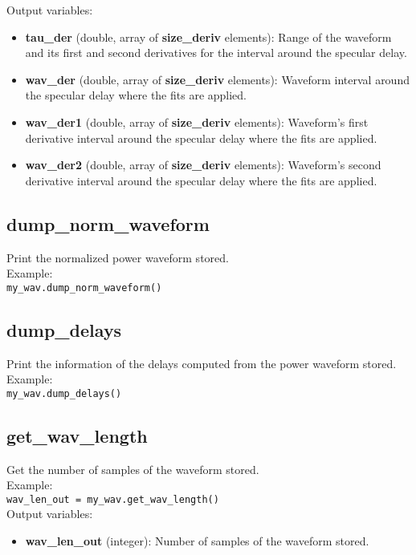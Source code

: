 Output variables:
\begin{itemize}
\item {\bf tau\_der} (double, array of {\bf size\_deriv} elements): Range of the waveform and its first and second derivatives for the interval around the specular delay.
\item {\bf wav\_der} (double, array of {\bf size\_deriv} elements): Waveform interval around the specular delay where the fits are applied.
\item {\bf wav\_der1} (double, array of {\bf size\_deriv} elements): Waveform's first derivative interval around the specular delay where the fits are applied.
\item {\bf wav\_der2} (double, array of {\bf size\_deriv} elements): Waveform's second derivative interval around the specular delay where the fits are applied.
\end{itemize}


\subsection{dump\_norm\_waveform}

Print the normalized power waveform stored.\\

Example:\\

\texttt{my\_wav.dump\_norm\_waveform()}\\


\subsection{dump\_delays}

Print the information of the delays computed from the power waveform stored.\\

Example:\\

\texttt{my\_wav.dump\_delays()}\\


\subsection{get\_wav\_length}

Get the number of samples of the waveform stored.\\

Example:\\

\texttt{wav\_len\_out = my\_wav.get\_wav\_length()}\\

Output variables:
\begin{itemize}
\item {\bf wav\_len\_out} (integer): Number of samples of the waveform stored.
\end{itemize}

